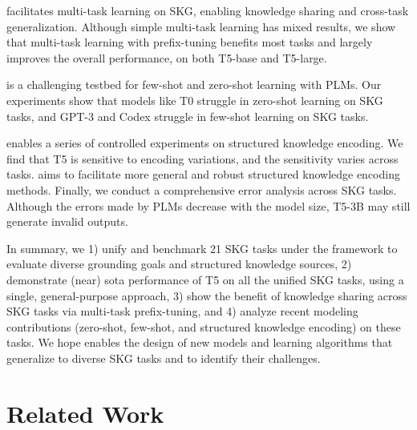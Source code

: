 \documentclass[11pt]{article}
\newcommand{\skg}{SKG\xspace}
\begin{document}
\uskg facilitates multi-task learning on \skg, enabling knowledge sharing and cross-task generalization. 
Although simple multi-task learning has mixed results, we show that multi-task learning with prefix-tuning \citep{li2021prefixtuning} benefits most tasks and largely improves the overall performance, on both T5-base and T5-large.

\uskg is a challenging testbed for few-shot \cite{brown2020language,Ye2021CrossFitAF} and zero-shot learning \cite{Zhong2021AdaptingLM,Jason2021,sanh2021multitask} with PLMs.
Our experiments show that models like T0 \cite{sanh2021multitask} struggle in zero-shot learning on \skg tasks, and GPT-3 \cite{brown2020language} and Codex \cite{chen2021evaluating} struggle in few-shot learning on \skg tasks.

\uskg enables a series of controlled experiments on structured knowledge encoding.
We find that T5 is sensitive to encoding variations, and the sensitivity varies across tasks.
\uskg aims to facilitate more general and robust structured knowledge encoding methods. 
Finally, we conduct a comprehensive error analysis across \skg tasks.
Although the errors made by PLMs decrease with the model size, T5-3B may still generate invalid outputs. 

In summary, we 1) unify and benchmark 21 \skg tasks under the \uskg framework to evaluate diverse grounding goals and structured knowledge sources, 2) demonstrate (near) sota performance of T5 on all the unified \skg tasks, using a single, general-purpose approach, 3) show the benefit of knowledge sharing across \skg tasks via multi-task prefix-tuning, and 4) analyze recent modeling contributions (zero-shot, few-shot, and structured knowledge encoding) on these tasks. 
We hope \uskg enables the design of new models and learning algorithms that generalize to diverse \skg tasks and to identify their challenges.


 
\section{Related Work}
\label{sec:related-work}
\end{document}
